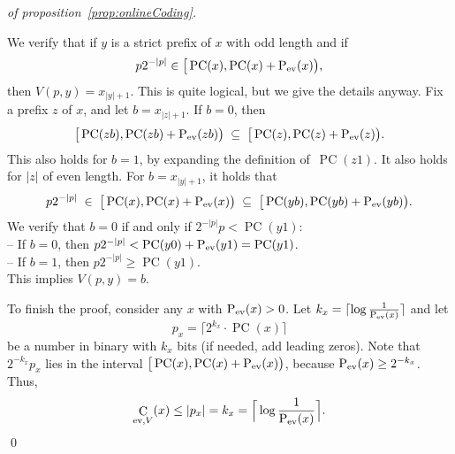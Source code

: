 \documentclass[runningheads]{llncs}
\DeclareMathOperator{\C}{C} \newcommand{\Cev}{\C_\textnormal{ev}} \newcommand{\Codd}{\C_\textnormal{odd}}
\DeclareMathOperator{\Pev}{P_{\textnormal{ev}}} \DeclareMathOperator{\Podd}{P_{\textnormal{odd}}} \DeclareMathOperator{\Pc}{PC}
\begin{document}
\begin{proof}[of proposition~\ref{prop:onlineCoding}]
  \begin{center}
  \end{center}
  
  \noindent
  We verify that if $y$ is a strict prefix of $x$ with odd length and if 
  \[
    p2^{-|p|} \in \big[\Pc(x), \Pc(x) + \Pev(x)\big), 
    \]
  then $V(p,y) = x_{|y|+1}$. This is quite logical, but we give the details anyway. Fix a prefix $z$ of $x$, and let $b = x_{|z|+1}$. If $b=0$, then 
  \[
    \big[\Pc(zb), \Pc(zb) + \Pev(zb)\big) \;\subseteq\; \big[\Pc(z), \Pc(z) + \Pev(z)\big). 
  \]
  This also holds for $b=1$, by expanding the definition of~$\Pc(z1)$. It also holds for $|z|$ of even length. 
  For $b = x_{|y|+1}$, it holds that
  \[
    p2^{-|p|} \;\in\; \big[\Pc(x), \Pc(x) + \Pev(x)\big) \;\subseteq\; \big[\Pc(yb), \Pc(yb) + \Pev(yb)\big). 
  \]
  We verify that $b = 0$ if and only if $2^{-|p|}p < \Pc(y1)$: 
  \\-- If $b = 0$, then $p2^{-|p|} < \Pc(y0) + \Pev(y1) = \Pc(y1)$. 
  \\-- If $b = 1$, then $p2^{-|p|} \ge \Pc(y1)$. 
  \\This implies $V(p,y) = b$. 

  \medskip
  To finish the proof, consider any $x$ with $\Pev(x)>0$. Let $k_x = \lceil \log \frac 1 {\Pev(x)} \rceil$ and let
  \[
    p_x = \lceil 2^{k_x} \cdot \Pc(x) \rceil
  \]
  be a number in binary with $k_x$ bits (if needed, add leading zeros). 
  Note that $2^{-k_x}p_x$ lies in the interval $\big[\Pc(x), \Pc(x) + \Pev(x)\big)$, because $\Pev(x) \ge 2^{-k_x}$. 
  Thus, 
  \[
    \C_{\textnormal{ev},V}(x) \le |p_x| = k_x = \Big\lceil \log \frac 1 {\Pev(x)} \Big\rceil. 
  \]
  \qed
\end{proof}
\end{document}
